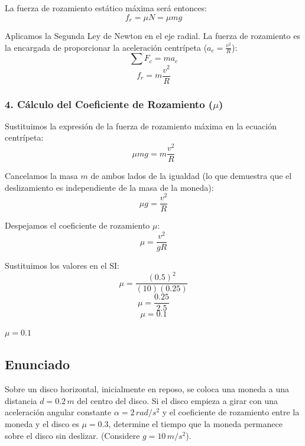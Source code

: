 \documentclass[12pt, a4paper]{article}
\begin{document}
La fuerza de rozamiento estático máxima será entonces:
$$ f_r = \mu N = \mu mg $$

Aplicamos la Segunda Ley de Newton en el eje radial. La fuerza de rozamiento es la encargada de proporcionar la aceleración centrípeta ($a_c = \frac{v^2}{R}$):
$$ \sum F_c = m a_c $$
$$ f_r = m \frac{v^2}{R} $$

\subsubsection*{4. Cálculo del Coeficiente de Rozamiento ($\mu$)}
Sustituimos la expresión de la fuerza de rozamiento máxima en la ecuación centrípeta:
$$ \mu mg = m \frac{v^2}{R} $$

Cancelamos la masa $m$ de ambos lados de la igualdad (lo que demuestra que el deslizamiento es independiente de la masa de la moneda):
$$ \mu g = \frac{v^2}{R} $$

Despejamos el coeficiente de rozamiento $\mu$:
$$ \mu = \frac{v^2}{g R} $$

Sustituimos los valores en el SI:
$$ \mu = \frac{(0.5)^2}{(10)(0.25)} $$
$$ \mu = \frac{0.25}{2.5} $$
$$ \mu = 0.1 $$

\begin{tcolorbox}[colback=green!5!white, colframe=green!50!black, title=Respuesta Final]
\centering \Large $\mu = 0.1$
\end{tcolorbox}

\newpage

\subsection*{Enunciado}
Sobre un disco horizontal, inicialmente en reposo, se coloca una moneda a una distancia $d = 0.2 \, \si{m}$ del centro del disco. Si el disco empieza a girar con una aceleración angular constante $\alpha = 2 \, \si{rad/s^2}$ y el coeficiente de rozamiento entre la moneda y el disco es $\mu = 0.3$, determine el tiempo que la moneda permanece sobre el disco sin deslizar. (Considere $g = 10 \, \si{m/s^2}$).

\begin{center}
\end{center}
\end{document}
